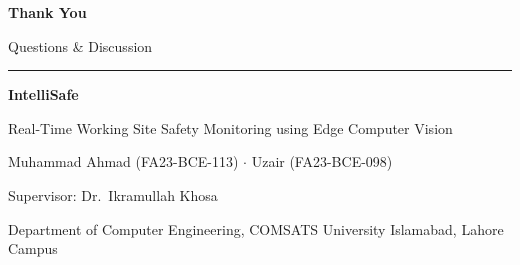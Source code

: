\documentclass[aspectratio=169,10pt]{beamer}
\begin{document}
\begin{frame}[plain]
  \centering
  \vspace{1.2em}
  {\Huge\bfseries\color{navy} Thank You}\par\vspace{0.4em}
  {\large\color{amber} Questions \& Discussion}\par\vspace{1.2em}
  {\color{slate!50}\rule{0.5\linewidth}{0.4pt}}\par\vspace{0.8em}
  {\normalsize\bfseries\color{navy} IntelliSafe}\par
  {\small Real-Time Working Site Safety Monitoring using Edge Computer Vision}\par\vspace{0.5em}
  {\footnotesize Muhammad Ahmad (FA23-BCE-113) $\cdot$ Uzair (FA23-BCE-098)}\par
  {\footnotesize Supervisor: Dr.\ Ikramullah Khosa}\par\vspace{0.3em}
  {\scriptsize\color{slate} Department of Computer Engineering, COMSATS University Islamabad, Lahore Campus}
\end{frame}
\end{document}
